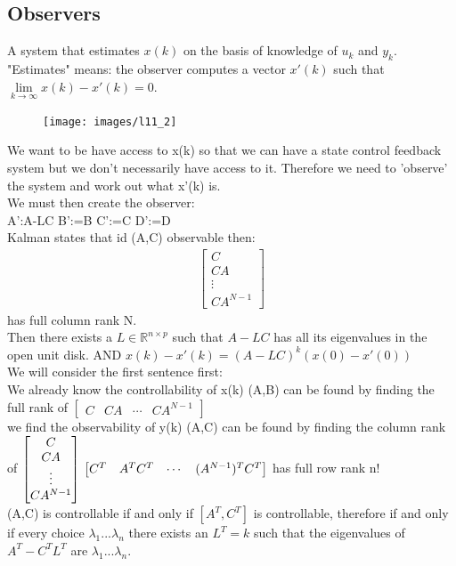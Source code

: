 \documentclass[a4paper,11pt]{article}
\begin{document}
		\subsection{Observers}
		A system that estimates $x(k)$ on the basis of knowledge of ${u_k}$ and ${y_k}$.\\
		"Estimates" means: the observer computes a vector $x'(k)$ such that $\lim\limits_{k\rightarrow \infty}x(k)-x'(k)=0$.\\
		\begin{figure}[htp]
		\centering
		\texttt{[image: images/l11\_2]}
		\end{figure}
		We want to be have access to x(k) so that we can have a state control feedback system but we don't necessarily have access to it. Therefore we need to 'observe' the system and work out what x'(k) is.\\
		
		We must then create the observer:\\
		A':A-LC \qquad B':=B \qquad	C':=C \qquad	D':=D \\

		Kalman states that id (A,C) observable then:
		\begin{gather}
			\begin{bmatrix}
				C\\
				CA\\
				\vdots\\
				CA^{N-1}
			\end{bmatrix}
		\end{gather}
		has full column rank N.\\
		Then there exists a $L\in\mathbb{R}^{n\times p}$ such that $A-LC$ has all its eigenvalues in the open unit disk. AND $x(k)-x'(k)=(A-LC)^k(x(0)-x'(0))$\\
		We will consider the first sentence first:\\ 
		We already know the controllability of x(k) (A,B) can be found by finding the full rank of $			\begin{bmatrix}
				C&
				CA&
				\cdots&
				CA^{N-1}
			\end{bmatrix}$\\
		we find the observability of y(k) (A,C) can be found by finding the column rank of 			$\begin{bmatrix}
						C\\
						CA\\
						\vdots\\
						CA^{N-1}
					\end{bmatrix}\\
								\begin{bmatrix}
				C^T&
				A^TC^T&
				\cdots&
				(A^{N-1})^TC^T
			\end{bmatrix}$ has full row rank n!\\
			(A,C) is controllable if and only if $[A^T,C^T]$ is controllable, therefore if and only if every choice $\lambda_1...\lambda_n$ there exists an $L^T=k$ such that the eigenvalues of $A^T-C^TL^T$ are $\lambda_1...\lambda_n$.\\
\end{document}

